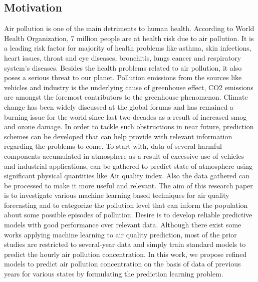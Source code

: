 \documentclass{article}
\begin{document}
\begin{itemize}
\subsection{\color{brown} Motivation}
Air pollution is one of the main detriments to human health.
According to World Health Organization, 7 million people are
at health risk due to air pollution. It is a leading risk factor
for majority of health problems like asthma, skin infections,
heart issues, throat and eye diseases, bronchitis, lungs cancer
and respiratory system’s diseases. Besides the health problems
related to air pollution, it also poses a serious threat to our
planet. Pollution emissions from the sources like vehicles and
industry is the underlying cause of greenhouse effect, CO2
emissions are amongst the foremost contributors to the
greenhouse phenomenon. Climate change has been widely
discussed at the global forums and has remained a burning
issue for the world since last two decades as a result of
increased smog and ozone damage. In order to tackle such obstructions in near future, prediction schemes can be developed that can help provide with relevant information regarding the problems to come. To start with, data of several harmful components accumulated in atmosphere as a result of excessive use of vehicles and industrial applications, can be gathered to predict state of atmosphere using significant physical quantities like Air quality index. Also the data gathered can be processed to make it more useful and relevant. The aim of this research paper is to investigate various machine learning based techniques for air quality forecasting and to categorize the pollution level that can inform the population about some possible episodes of pollution. Desire is to develop reliable predictive models with good performance over relevant data. Although there exist some works applying machine learning to air quality prediction, most of the prior studies are restricted to several-year data and simply train standard  models  to predict the hourly air pollution concentration. In this work, we propose refined models to predict  air pollution concentration on the basis of data of previous years for various states  by formulating the prediction learning problem. 


\end{itemize}
\end{document}
